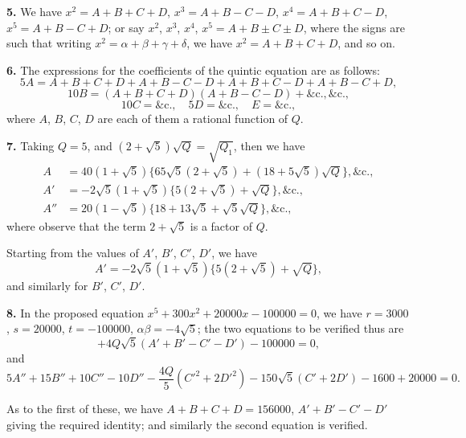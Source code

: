 \documentclass[11pt,a4paper]{book}
\begin{document}
\vspace{0.5em}
\textbf{5.} We have $x^2 = A + B + C + D$, $x^3 = A + B - C - D$, $x^4 = A + B + C - D$, $x^5 = A + B - C + D$; or say $x^2$, $x^3$, $x^4$, $x^5 = A + B \pm C \pm D$, where the signs are such that writing $x^2 = \alpha + \beta + \gamma + \delta$, we have $x^2 = A + B + C + D$, and so on.

\vspace{0.5em}
\textbf{6.} The expressions for the coefficients of the quintic equation are as follows:
\[
5A = A + B + C + D + A + B - C - D + A + B + C - D + A + B - C + D,
\]
\[
10B = (A+B+C+D)(A+B-C-D) + \&\text{c.}, \&\text{c.},
\]
\[
10C = \&\text{c.}, \quad 5D = \&\text{c.}, \quad E = \&\text{c.},
\]
where $A$, $B$, $C$, $D$ are each of them a rational function of $Q$.

\vspace{0.5em}
\textbf{7.} Taking $Q = 5$, and $(2 + \sqrt{5})\sqrt{Q} = \sqrt{Q_1}$, then we have
\begin{align*}
A &= 40(1 + \sqrt{5})\{65\sqrt{5}(2 + \sqrt{5}) + (18 + 5\sqrt{5})\sqrt{Q}\}, \&\text{c.}, \\
A' &= -2\sqrt{5}(1 + \sqrt{5})\{5(2 + \sqrt{5}) + \sqrt{Q}\}, \&\text{c.}, \\
A'' &= 20(1 - \sqrt{5})\{18 + 13\sqrt{5} + \sqrt{5}\sqrt{Q}\}, \&\text{c.},
\end{align*}
where observe that the term $2 + \sqrt{5}$ is a factor of $Q$.

Starting from the values of $A'$, $B'$, $C'$, $D'$, we have
\[
A' = -2\sqrt{5}(1 + \sqrt{5})\{5(2 + \sqrt{5}) + \sqrt{Q}\},
\]
and similarly for $B'$, $C'$, $D'$.

\vspace{0.5em}
\textbf{8.} In the proposed equation $x^5 + 300x^2 + 20000x - 100000 = 0$, we have $r = 3000$, $s = 20000$, $t = -100000$, $\alpha\beta = -4\sqrt{5}$; the two equations to be verified thus are
\[
+ 4Q\sqrt{5}(A' + B' - C' - D') - 100000 = 0,
\]
and
\[
5A'' + 15B'' + 10C'' - 10D'' - \frac{4Q}{5}(C'^2 + 2D'^2) - 150\sqrt{5}(C' + 2D') - 1600 + 20000 = 0.
\]

As to the first of these, we have $A + B + C + D = 156000$, $A' + B' - C' - D'$ giving the required identity; and similarly the second equation is verified.

\newpage
{}
\end{document}
